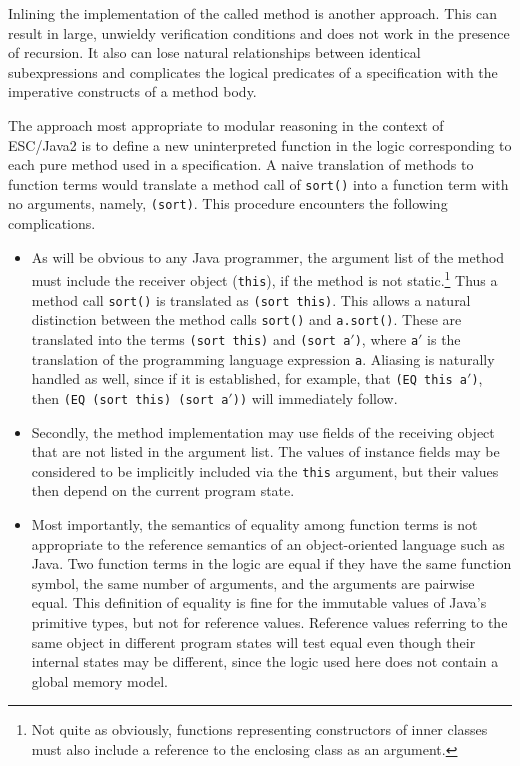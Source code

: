 \documentclass{sig-alternate}
\begin{document}
Inlining the implementation of the called method is another approach.  This can result in large,
 unwieldy verification conditions and does not work in the presence of recursion.  It also can
lose natural relationships between identical subexpressions and complicates the logical
predicates of a specification with the imperative constructs of a method body.

The approach most appropriate to modular reasoning in the context of ESC/Java2 is to
define a new uninterpreted function in the logic corresponding to each pure method used
in a specification.  A naive translation of methods to
function terms would translate a method call of \texttt{sort()} into a function term with no
arguments, namely, \texttt{(sort)}.  This procedure encounters the following complications.
\setlength{\partopsep}{0in}\setlength{\parskip}{0in}\setlength{\itemsep}{0in}\setlength{\topsep}{0in}
\begin{itemize}
\setlength{\partopsep}{0in}\setlength{\parskip}{0in}\setlength{\itemsep}{0in}\setlength{\topsep}{0in}
\item
As will be obvious to any Java programmer, the argument list of the method 
must include the receiver object (\texttt{this}), if the method is not static.\footnote{Not quite as obviously,
functions representing constructors of inner classes must also include a reference to the
enclosing class as an argument.}  Thus a method call 
\texttt{sort()} is translated as \texttt{(sort this)}.
This allows a natural distinction between the method calls \texttt{sort()} and \texttt{a.sort()}.  
These are translated into the terms \texttt{(sort this)} and \texttt{(sort a$'$)}, 
where \texttt{a$'$} is the translation of
the programming language expression \texttt{a}.  
Aliasing is naturally handled as well, since if it is established, for example, that
\texttt{(EQ this a$'$)}, then \texttt{(EQ (sort this) (sort a$'$))} will immediately follow.

\item
Secondly, the method implementation may use fields
of the receiving object that are not listed in the argument list.  The values of instance fields
may be considered to be implicitly included via the \texttt{this} argument, but their values then
depend on the current program state.  

\item
Most importantly, the semantics of equality among function terms is not appropriate to the
reference semantics of an object-oriented language such as Java.  Two function terms in the
logic are equal if they have the same function symbol, the same number of arguments, and the
arguments are pairwise equal.  This definition of equality is fine for the immutable
values of Java's primitive types, but not for reference values.  Reference values 
referring to the
same object in different program
states will test equal even though their internal states may be different, since
the logic used here does not contain a global memory model.

\end{itemize}
\end{document}

